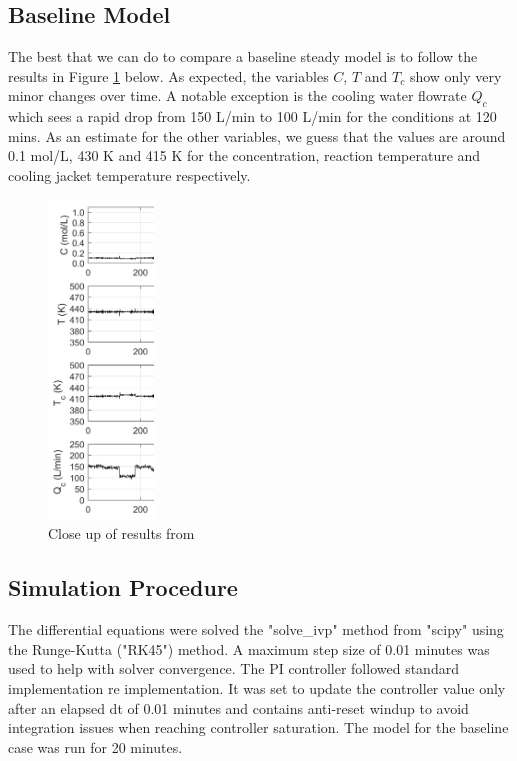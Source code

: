 \documentclass{article}
\begin{document}
\subsection{Baseline Model}
\label{sec:baseline_model}

The best that we can do to compare a baseline steady model is to follow the results in Figure \ref{fig:results_paper_closeup} below. As expected, the variables $C$, $T$ and $T_c$ show only very minor changes over time. A notable exception is the cooling water flowrate $Q_c$ which sees a rapid drop from 150 L/min to 100 L/min for the conditions at 120 mins. As an estimate for the other variables, we guess that the values are around 0.1 mol/L, 430 K and 415 K for the concentration, reaction temperature and cooling jacket temperature respectively.  


\begin{figure}[H]
	\centering
	\includegraphics[width=0.25\textwidth]{img/results_paper_closeup}
	\caption{Close up of results from \cite{pilario2018canonical}}
	\label{fig:results_paper_closeup}
\end{figure}

\subsection{Simulation Procedure}


The differential equations were solved the "solve\_ivp" method from "scipy" using the Runge-Kutta ("RK45") method. A maximum step size of 0.01 minutes was used to help with solver convergence. The PI controller followed standard implementation re implementation. It was set to update the controller value only after an elapsed dt of 0.01 minutes and contains anti-reset windup to avoid integration issues when reaching controller saturation. The model for the baseline case was run for 20 minutes.
\end{document}

